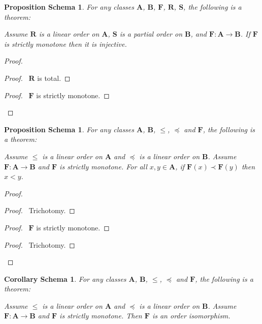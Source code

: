 \documentclass{book}
\let\qed\relax
\newtheorem{props}[ax]{Proposition Schema}
\newtheorem{cors}{Corollary Schema}[ax]
\theoremstyle{definition}
\begin{document}
\begin{props}
\label{prop:strictmonotoneinj}
For any classes $\mathbf{A}$, $\mathbf{B}$, $\mathbf{F}$, $\mathbf{R}$, $\mathbf{S}$, the following is a theorem:

Assume $\mathbf{R}$ is a linear order on $\mathbf{A}$, $\mathbf{S}$ is a partial order on $\mathbf{B}$, and $\mathbf{F} : \mathbf{A} \rightarrow \mathbf{B}$. If $\mathbf{F}$ is strictly monotone then it is injective.
\end{props}

\begin{proof}
\pf
{}
\begin{proof}
	\pf\ $\mathbf{R}$ is total.
\end{proof}
\begin{proof}
	\pf\ $\mathbf{F}$ is strictly monotone.
\end{proof}
\qed
\end{proof}

\begin{props}
\label{prop:strictmonotoneinv}
For any classes $\mathbf{A}$, $\mathbf{B}$, $\leq$, $\preccurlyeq$ and $\mathbf{F}$, the following is a theorem:

Assume $\leq$ is a linear order on $\mathbf{A}$ and $\preccurlyeq$ is a linear order on $\mathbf{B}$. Assume $\mathbf{F} : \mathbf{A} \rightarrow \mathbf{B}$ and $\mathbf{F}$ is strictly monotone. For all $x,y \in \mathbf{A}$, if $\mathbf{F}(x) \prec \mathbf{F}(y)$ then $x < y$.
\end{props}

\begin{proof}
\pf
{}
\begin{proof}
	\pf\ Trichotomy.
\end{proof}
\begin{proof}
	\pf\ $\mathbf{F}$ is strictly monotone.
\end{proof}
\begin{proof}
	\pf\ Trichotomy.
\end{proof}
\qed
\end{proof}

\begin{cors}
\label{cor:orderiso}
For any classes $\mathbf{A}$, $\mathbf{B}$, $\leq$, $\preccurlyeq$ and $\mathbf{F}$, the following is a theorem:

Assume $\leq$ is a linear order on $\mathbf{A}$ and $\preccurlyeq$ is a linear order on $\mathbf{B}$. Assume $\mathbf{F} : \mathbf{A} \rightarrow \mathbf{B}$ and $\mathbf{F}$ is strictly monotone. Then $\mathbf{F}$ is an order isomorphism.
\end{cors}
\end{document}

